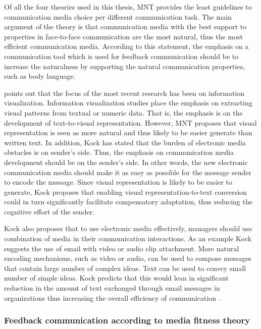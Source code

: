 \documentclass[english,12pt,a4paper,pdftex]{article}
\begin{document}
Of all the four theories used in this thesis, \ac{MNT} provides the least guidelines to communication media choice per different communication task. The main argument of the theory is that communication media with the best support to properties in face-to-face communication are the most natural, thus the most efficient communication media. According to this statement, the emphasis on a communication tool which is used for feedback communication should be to increase the naturalness by supporting the natural communication properties, such as body language. \citep{kock2005} \citep{kock2004}

\citet{kock2007} points out that the focus of the most recent research has been on information visualization. Information visualization studies place the emphasis on extracting visual patterns from textual or numeric data. That is, the emphasis is on the development of text-to-visual representation. However, \ac{MNT} proposes that visual representation is seen as more natural and thus likely to be easier generate than written text. In addition, Kock has stated that the burden of electronic media obstacles is on sender's side. Thus, the emphasis on communication media development should be on the sender's side. In other words, the new electronic communication media should make it as easy as possible for the message sender to encode the message. Since visual representation is likely to be easier to generate, Kock proposes that enabling visual representation-to-text conversion could in turn significantly facilitate compensatory adaptation, thus reducing the cognitive effort of the sender.

Kock also proposes that to use electronic media effectively, managers should use combination of media in their communication interactions. As an example Kock suggests the use of email with video or audio clip attachment. More natural encoding mechanisms, such as video or audio, can be used to compose messages that contain large number of complex ideas. Text can be used to convey small number of simple ideas. Kock predicts that this would lean in significant reduction in the amount of text exchanged through email messages in organizations thus increasing the overall efficiency of communication \citet{kock2007}.

\subsubsection{Feedback communication according to media fitness theory}
\label{sec:feedback_mft}
\end{document}
